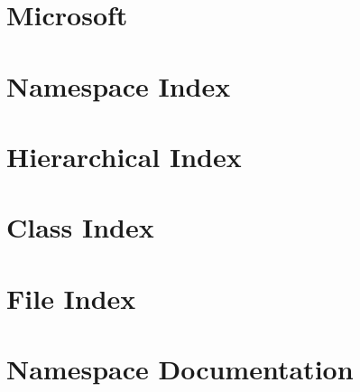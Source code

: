 \documentclass[twoside]{book}
\begin{document}
\chapter{Microsoft}
\label{a00036}
\hypertarget{a00036}{}

\chapter{Namespace Index}

\chapter{Hierarchical Index}

\chapter{Class Index}

\chapter{File Index}

\chapter{Namespace Documentation}












\end{document}

